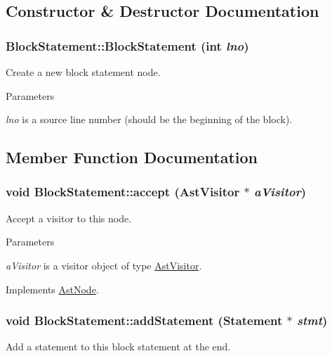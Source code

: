 \subsection{Constructor \& Destructor Documentation}
\hypertarget{classBlockStatement_a7d28cb688a765ca809bc55aa75e0b245}{
\subsubsection[{BlockStatement}]{\setlength{\rightskip}{0pt plus 5cm}BlockStatement::BlockStatement (int {\em lno})}}
\label{classBlockStatement_a7d28cb688a765ca809bc55aa75e0b245}
Create a new block statement node.


\begin{DoxyParams}{Parameters}
\item[{\em lno}]is a source line number (should be the beginning of the block). \end{DoxyParams}


\subsection{Member Function Documentation}
\hypertarget{classBlockStatement_a20df05e7536e375226639b483e8c4732}{
\subsubsection[{accept}]{\setlength{\rightskip}{0pt plus 5cm}void BlockStatement::accept ({\bf AstVisitor} $\ast$ {\em aVisitor})}}
\label{classBlockStatement_a20df05e7536e375226639b483e8c4732}
Accept a visitor to this node. 
\begin{DoxyParams}{Parameters}
\item[{\em aVisitor}]is a visitor object of type \hyperlink{classAstVisitor}{AstVisitor}. \end{DoxyParams}


Implements \hyperlink{classAstNode_a67b2d6ce1262da2954fb4db255759fb3}{AstNode}.\hypertarget{classBlockStatement_adbd315994e8319333c0f7cd22681ec31}{
\subsubsection[{addStatement}]{\setlength{\rightskip}{0pt plus 5cm}void BlockStatement::addStatement ({\bf Statement} $\ast$ {\em stmt})}}
\label{classBlockStatement_adbd315994e8319333c0f7cd22681ec31}
Add a statement to this block statement at the end.


